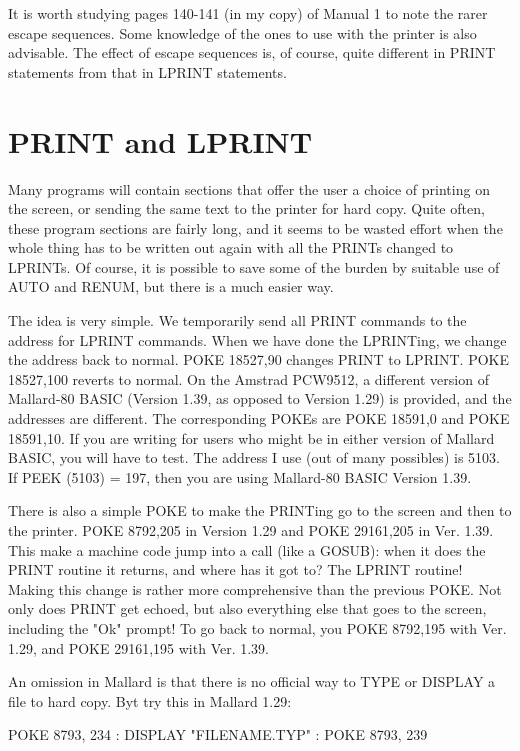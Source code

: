 \documentclass[]{report} %
\begin{document}
It is worth studying pages 140-141 (in my copy) of Manual 1 to note the  rarer 
escape  sequences. Some knowledge of the ones to use with the printer is  also 
advisable.  The effect of escape sequences is, of course, quite  different  in 
PRINT statements from that in LPRINT statements.

\section{PRINT and LPRINT}
Many  programs will contain sections that offer the user a choice of  printing 
on  the screen, or sending the same text to the printer for hard  copy.  Quite 
often,  these  program  sections are fairly long, and it seems  to  be  wasted 
effort  when the whole thing has to be written out again with all  the  PRINTs 
changed  to LPRINTs. Of course, it is possible to save some of the  burden  by 
suitable use of AUTO and RENUM, but there is a much easier way.

The idea is very simple. We temporarily send all PRINT commands to the address 
for  LPRINT commands. When we have done the LPRINTing, we change  the  address 
back to normal. POKE 18527,90 changes PRINT to LPRINT. POKE 18527,100  reverts 
to  normal.  On the Amstrad PCW9512, a different version of  Mallard-80  BASIC 
(Version 1.39, as opposed to Version 1.29) is provided, and the addresses  are 
different. The corresponding POKEs are POKE 18591,0 and POKE 18591,10. If  you 
are  writing  for users who might be in either version of Mallard  BASIC,  you 
will have to test. The address I use (out of many possibles) is 5103. If  PEEK 
(5103) = 197, then you are using Mallard-80 BASIC Version 1.39.

There is also a simple POKE to make the PRINTing go to the screen and then  to 
the  printer. POKE 8792,205 in Version 1.29 and POKE 29161,205 in  Ver.  1.39. 
This  make  a machine code jump into a call (like a GOSUB): when it  does  the 
PRINT routine it returns, and where has it got to? The LPRINT routine!  Making 
this change is rather more comprehensive than the previous POKE. Not only does 
PRINT get echoed, but also everything else that goes to the screen,  including 
the  "Ok" prompt! To go back to normal, you POKE 8792,195 with Ver. 1.29,  and 
POKE 29161,195 with Ver. 1.39.

An  omission in Mallard is that there is no official way to TYPE or DISPLAY  a 
file to hard copy. Byt try this in Mallard 1.29:

        POKE 8793, 234 : DISPLAY "FILENAME.TYP" : POKE 8793, 239
\end{document}
